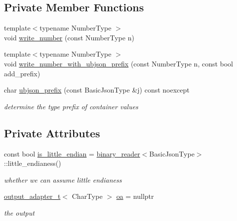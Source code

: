 \subsection*{Private Member Functions}
\begin{DoxyCompactItemize}
\item 
{\footnotesize template$<$typename Number\+Type $>$ }\\void \hyperlink{classnlohmann_1_1detail_1_1binary__writer_a62cfd50a511371e718f37ad7bb29ae9d}{write\+\_\+number} (const Number\+Type n)
\item 
{\footnotesize template$<$typename Number\+Type $>$ }\\void \hyperlink{classnlohmann_1_1detail_1_1binary__writer_a6a40756933ccc4f69e3d885fe2e9032b}{write\+\_\+number\+\_\+with\+\_\+ubjson\+\_\+prefix} (const Number\+Type n, const bool add\+\_\+prefix)
\item 
char \hyperlink{classnlohmann_1_1detail_1_1binary__writer_a67e1f5bb505bf9269c1e1e71d389291d}{ubjson\+\_\+prefix} (const Basic\+Json\+Type \&j) const noexcept
\begin{DoxyCompactList}\small\item\em determine the type prefix of container values \end{DoxyCompactList}\end{DoxyCompactItemize}
\subsection*{Private Attributes}
\begin{DoxyCompactItemize}
\item 
const bool \hyperlink{classnlohmann_1_1detail_1_1binary__writer_a048887c907afe39759b777e8c888414c}{is\+\_\+little\+\_\+endian} = \hyperlink{classnlohmann_1_1detail_1_1binary__reader}{binary\+\_\+reader}$<$Basic\+Json\+Type$>$\+::little\+\_\+endianess()
\begin{DoxyCompactList}\small\item\em whether we can assume little endianess \end{DoxyCompactList}\item 
\hyperlink{namespacenlohmann_1_1detail_a9b680ddfb58f27eb53a67229447fc556}{output\+\_\+adapter\+\_\+t}$<$ Char\+Type $>$ \hyperlink{classnlohmann_1_1detail_1_1binary__writer_a6f15b782a7900f50ef37d123008e601b}{oa} = nullptr
\begin{DoxyCompactList}\small\item\em the output \end{DoxyCompactList}\end{DoxyCompactItemize}


